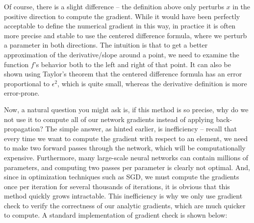 \documentclass{tufte-handout}
\begin{document}
Of course, there is a slight difference -- the definition above only perturbs $x$ in the positive direction to compute the gradient. While it would have been perfectly acceptable to define the numerical gradient in this way, in practice it is often more precise and stable to use the {centered difference formula}, where we perturb a parameter in both directions. The intuition is that to get a better approximation of the derivative/slope around a point, we need to examine the function $f$'s behavior both to the left and right of that point. It can also be shown using Taylor's theorem that the centered difference formula has an error proportional to $\epsilon^2$, which is quite small, whereas the derivative definition is more error-prone.

Now, a natural question you might ask is, if this method is so precise, why do we not use it to compute all of our network gradients instead of applying back-propagation? The simple answer, as hinted earlier, is inefficiency -- recall that every time we want to compute the gradient with respect to an element, we need to make two forward passes through the network, which will be computationally expensive. Furthermore, many large-scale neural networks can contain millions of parameters, and computing two passes per parameter is clearly not optimal. And, since in optimization techniques such as SGD, we must compute the gradients once per iteration for several thousands of iterations, it is obvious that this method quickly grows intractable. This inefficiency is why we only use gradient check to verify the correctness of our analytic gradients, which are much quicker to compute. A standard implementation of gradient check is shown below:
\end{document}
